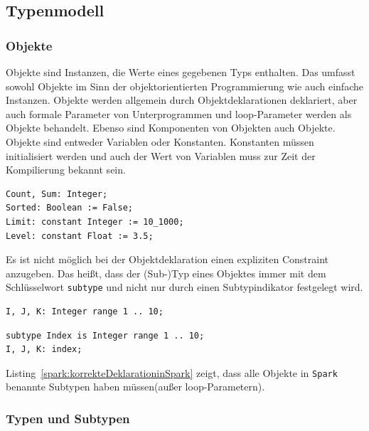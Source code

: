 

\subsection{Typenmodell}
\label{subsec:Typenmodell}
\subsubsection{Objekte}
\label{subsubsec:Objekte}
Objekte sind Instanzen, die Werte eines gegebenen Typs enthalten. Das umfasst sowohl Objekte im Sinn der objektorientierten Programmierung wie auch einfache Instanzen. Objekte werden allgemein durch Objektdeklarationen deklariert, aber auch formale Parameter von Unterprogrammen und loop-Parameter werden als Objekte behandelt. Ebenso sind Komponenten von Objekten auch Objekte.\\
Objekte sind entweder Variablen oder Konstanten. Konstanten müssen initialisiert werden und auch der Wert von Variablen muss zur Zeit der Kompilierung bekannt sein.\\
\begin{lstlisting}[caption={Beispiele für einfache Objekte in Spark}, label=spark:einfacheObjekte]
Count, Sum: Integer;
Sorted: Boolean := False;
Limit: constant Integer := 10_1000;
Level: constant Float := 3.5;
\end{lstlisting}


Es ist nicht möglich bei der Objektdeklaration einen expliziten Constraint anzugeben. Das heißt, dass der (Sub-)Typ eines Objektes immer mit dem Schlüsselwort \texttt{subtype} und nicht nur durch einen Subtypindikator festgelegt wird.

\begin{lstlisting}[caption={Deklaration gültig in Ada, aber unzulässig in Spark}, label=ada:falscheDeklarationinAda]
I, J, K: Integer range 1 .. 10;
\end{lstlisting}

\begin{lstlisting}[caption={korrekte Deklaration in Spark}, label=spark:korrekteDeklarationinSpark]
subtype Index is Integer range 1 .. 10;
I, J, K: index;
\end{lstlisting}


Listing~\ref{spark:korrekteDeklarationinSpark} zeigt, dass alle Objekte in \texttt{Spark} benannte Subtypen haben müssen(außer loop-Parametern).

\newpage

\subsubsection{Typen und Subtypen}
\label{subsubsec:TypenUndSubtypen}

